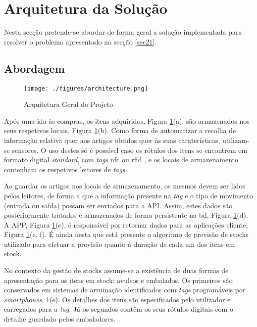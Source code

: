 %
%
\section{Arquitetura da Solução}\label{sec22}

Nesta secção pretende-se abordar de forma geral a solução implementada para resolver o problema apresentado na secção \ref{sec21}.

%
%
\subsection{Abordagem}\label{subsec221}

\begin{figure}[H]
	\centering
	\texttt{[image: ./figures/architecture.png]}
	\caption{Arquitetura Geral do Projeto}
	\label{project-general-architecture}
\end{figure}

Após uma ida às compras, os itens adquiridos, Figura \ref{project-general-architecture}(a), são armazenados nos seus respetivos locais, Figura \ref{project-general-architecture}(b). Como forma de automatizar a recolha de informação relativa quer aos artigos obtidos quer às suas caraterísticas, utilizam-se sensores. O uso destes só é possível caso os rótulos dos itens se encontrem em formato digital \textit{standard}, com \textit{tags} \acrfull{nfc} \cite{nfcforum:nfc} ou \acrfull{rfid} \cite{rfidinc:rfid}, e os locais de armazenamento contenham os respetivos leitores de \textit{tags}.

Ao guardar os artigos nos locais de armazenamento, os mesmos devem ser lidos pelos leitores, de forma a que a informação presente na \textit{tag} e o tipo de movimento (entrada ou saída) possam ser enviados para a API. Assim, estes dados são posteriormente tratados e armazenados de forma persistente na \acrfull{bd}, Figura \ref{project-general-architecture}(d). A APP, Figura \ref{project-general-architecture}(c), é responsável por retornar dados para as aplicações cliente, Figura \ref{project-general-architecture}(e, f). É ainda nesta que está presente o algoritmo de previsão de stocks utilizado para efetuar a previsão quanto à duração de cada um dos itens em stock.

No contexto da gestão de stocks assume-se a existência de duas formas de apresentação para os itens em stock: avulsos e embalados. Os primeiros são conservados em sistemas de arrumação identificados com \textit{tags} programáveis por \textit{smartphones}, \ref{project-general-architecture}(e). Os detalhes dos itens são especificados pelo utilizador e carregados para a \textit{tag}. Já os segundos contêm os seus rótulos digitais com o detalhe guardado pelos embaladores.\\

